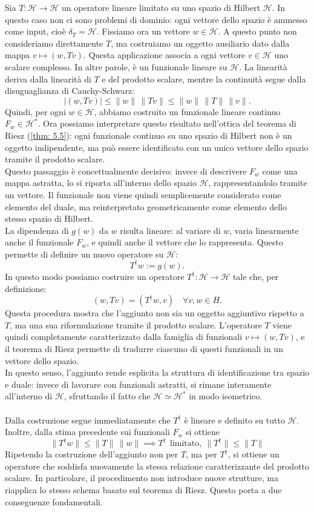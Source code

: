 \documentclass[a4paper,12pt]{report}
\begin{document}
Sia $T:\mathscr{H} \to \mathscr{H}$ un operatore lineare limitato su uno spazio di Hilbert $\mathscr{H}$. In questo caso non ci sono problemi di dominio: ogni vettore dello spazio è ammesso come input, cioè $\delta_T = \mathscr{H}$.
Fissiamo ora un vettore $w \in \mathscr{H}$. A questo punto non consideriamo direttamente $T$, ma costruiamo un oggetto ausiliario dato dalla mappa $v \mapsto (w, Tv)$. Questa applicazione associa a ogni vettore $v\in \mathscr{H}$ uno scalare complesso. In altre parole, è un funzionale lineare su $\mathscr{H}$. La linearità deriva dalla linearità di $T$ e del prodotto scalare, mentre la continuità segue dalla disuguaglianza di Cauchy-Schwarz:
\[
|(w,Tv)| \le \|w\|\,\|Tv\| \le \|w\|\,\|T\|\,\|v\|.
\]
Quindi, per ogni $w \in \mathscr{H}$, abbiamo costruito un funzionale lineare continuo $F_w \in \mathscr{H}^*$. Ora possiamo interpretare questo risultato nell'ottica del teorema di Riesz (\ref{thm: 5.5}): ogni funzionale continuo su uno spazio di Hilbert non è un oggetto indipendente, ma può essere identificato con un unico vettore dello spazio tramite il prodotto scalare.
\\Questo passaggio è concettualmente decisivo: invece di descrivere $F_w$ come una mappa astratta, lo si riporta all’interno dello spazio $\mathscr{H}$, rappresentandolo tramite un vettore. Il funzionale non viene quindi semplicemente considerato come elemento del duale, ma reinterpretato geometricamente come elemento dello stesso spazio di Hilbert. 
\\La dipendenza di $g(w)$ da $w$ risulta lineare: al variare di $w$, varia linearmente anche il funzionale $F_w$, e quindi anche il vettore che lo rappresenta. Questo permette di definire un nuovo operatore su $\mathscr{H}$:
\[
T^\dagger w := g(w).
\]
In questo modo possiamo costruire un operatore $T^\dagger : \mathscr{H} \to \mathscr{H}$ tale che, per definizione:
\[
(w, Tv) = (T^\dagger w, v)\quad \forall v,w \in H.
\]
Questa procedura mostra che l’aggiunto non sia un oggetto aggiuntivo rispetto a $T$, ma una sua riformulazione tramite il prodotto scalare. L’operatore $T$ viene quindi completamente caratterizzato dalla famiglia di funzionali $v \mapsto (w,Tv)$, e il teorema di Riesz permette di tradurre ciascuno di questi funzionali in un vettore dello spazio.
\\In questo senso, l’aggiunto rende esplicita la struttura di identificazione tra spazio e duale: invece di lavorare con funzionali astratti, si rimane interamente all’interno di $\mathscr{H}$, sfruttando il fatto che $\mathscr{H} \simeq \mathscr{H}^*$ in modo isometrico.
\\
\\Dalla costruzione segue immediatamente che $T^\dagger$ è lineare e definito su tutto $\mathscr{H}$. Inoltre, dalla stima precedente sui funzionali $F_w$ si ottiene
\[
\|T^\dagger w\| \le \|T\|\,\|w\|\implies T^\dagger \ \ \text{limitato}, \ \|T^\dagger\|\leq \|T\|
\]
Ripetendo la costruzione dell’aggiunto non per $T$, ma per $T^\dagger$, si ottiene un operatore che soddisfa nuovamente la stessa relazione caratterizzante del prodotto scalare. In particolare, il procedimento non introduce nuove strutture, ma riapplica lo stesso schema basato sul teorema di Riesz. Questo porta a due conseguenze fondamentali.
\end{document}
